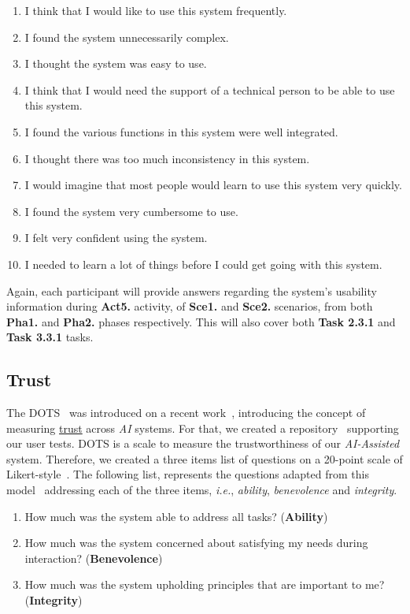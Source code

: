 \begin{enumerate}
\item I think that I would like to use this system frequently.
\item I found the system unnecessarily complex.
\item I thought the system was easy to use.
\item I think that I would need the support of a technical person to be able to use this system.
\item I found the various functions in this system were well integrated.
\item I thought there was too much inconsistency in this system.
\item I would imagine that most people would learn to use this system very quickly.
\item I found the system very cumbersome to use.
\item I felt very confident using the system.
\item I needed to learn a lot of things before I could get going with this system.
\end{enumerate}

Again, each participant will provide answers regarding the system's usability information during {\bf Act5.} activity, of {\bf Sce1.} and {\bf Sce2.} scenarios, from both {\bf Pha1.} and {\bf Pha2.} phases respectively. This will also cover both {\bf Task 2.3.1} and {\bf Task 3.3.1} tasks.

\subsection{Trust}

The \gls{DOTS}~\cite{francisco_maria_calisto_2019_2671717, https://doi.org/10.13140/rg.2.2.23078.37448} was introduced on a recent work~\cite{Cai:2019:EEE:3301275.3302289, Cai:2019:HTC:3290605.3300234}, introducing the concept of measuring \underline{trust} across {\it AI} systems.
For that, we created a repository~\cite{francisco_maria_calisto_2019_2671717} supporting our user tests.
\gls{DOTS} is a scale to measure the trustworthiness of our {\it AI-Assisted} system.
Therefore, we created a three items list of questions on a 20-point scale of Likert-style~\cite{joshi2015likert}.
The following list, represents the questions adapted from this model~\cite{mayer1995integrative} addressing each of the three items, {\it i.e.}, {\it ability}, {\it benevolence} and {\it integrity}.

\begin{enumerate}
\item How much was the system able to address all tasks? ({\bf Ability})
\item How much was the system concerned about satisfying my needs during interaction? ({\bf Benevolence})
\item How much was the system upholding principles that are important to me? ({\bf Integrity})
\end{enumerate}

